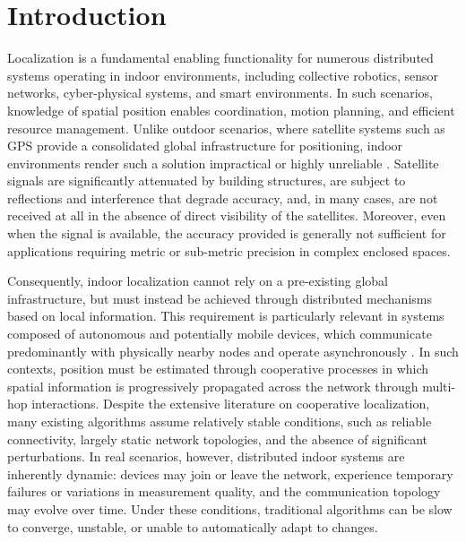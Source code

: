 \documentclass[runningheads]{llncs}
\begin{document}
\section{Introduction}

Localization is a fundamental enabling functionality for numerous distributed systems operating in indoor environments, including collective robotics, sensor networks, cyber-physical systems, and smart environments. In such scenarios, knowledge of spatial position enables coordination, motion planning, and efficient resource management.
Unlike outdoor scenarios, where satellite systems such as GPS provide a consolidated global infrastructure for positioning, indoor environments render such a solution impractical or highly unreliable \cite{DBLP:journals/telsys/NiculescuN03}. Satellite signals are significantly attenuated by building structures, are subject to reflections and interference that degrade accuracy, and, in many cases, are not received at all in the absence of direct visibility of the satellites. Moreover, even when the signal is available, the accuracy provided is generally not sufficient for applications requiring metric or sub-metric precision in complex enclosed spaces.

Consequently, indoor localization cannot rely on a pre-existing global infrastructure, but must instead be achieved through distributed mechanisms based on local information. This requirement is particularly relevant in systems composed of autonomous and potentially mobile devices, which communicate predominantly with physically nearby nodes and operate asynchronously \cite{DBLP:journals/percom/TestaADT22}. In such contexts, position must be estimated through cooperative processes in which spatial information is progressively propagated across the network through multi-hop interactions.
Despite the extensive literature on cooperative localization, many existing algorithms assume relatively stable conditions, such as reliable connectivity, largely static network topologies, and the absence of significant perturbations. In real scenarios, however, distributed indoor systems are inherently dynamic: devices may join or leave the network, experience temporary failures or variations in measurement quality, and the communication topology may evolve over time. Under these conditions, traditional algorithms can be slow to converge, unstable, or unable to automatically adapt to changes.
\end{document}
